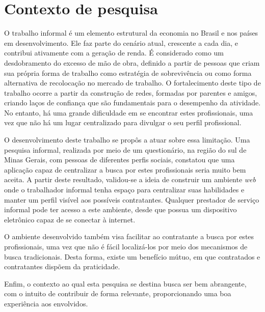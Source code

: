 \section{Contexto de pesquisa}
\par O trabalho informal é um elemento estrutural da economia no Brasil e nos países em desenvolvimento. Ele faz parte do cenário atual, crescente a cada dia, e contribui ativamente com a geração de renda. É considerado como um desdobramento do excesso de mão de obra, definido a partir de pessoas que criam sua própria forma de trabalho como estratégia de sobrevivência ou como forma alternativa de recolocação no mercado de trabalho. O fortalecimento deste tipo de trabalho ocorre a partir da construção de redes, formadas por parentes e amigos, criando laços de confiança que são fundamentais para o desempenho da atividade. No entanto, há uma grande dificuldade em se encontrar estes profissionais, uma vez que não há um lugar centralizado para divulgar o seu perfil profissional.

\par O desenvolvimento deste trabalho se propôs a atuar sobre essa limitação. Uma pesquisa informal, realizada por meio de um questionário, na região do sul de Minas Gerais, com pessoas de diferentes perfis sociais, constatou que uma aplicação capaz de centralizar a busca por estes profissionais seria muito bem aceita. A partir deste resultado, validou-se a ideia de construir um ambiente \textit{web} onde o trabalhador informal tenha espaço para centralizar suas habilidades e manter um perfil visível aos possíveis contratantes. Qualquer prestador de serviço informal pode ter acesso a este ambiente, desde que possua um dispositivo eletrônico capaz de se conectar à internet. 

\par O ambiente desenvolvido também visa facilitar ao contratante a busca por estes profissionais, uma vez que não é fácil localizá-los por meio dos mecanismos de busca tradicionais. Desta forma, existe um benefício mútuo, em que contratados e contratantes dispõem da praticidade.

\par Enfim, o contexto ao qual esta pesquisa se destina busca ser bem abrangente, com o intuito de contribuir de forma relevante, proporcionando uma boa experiência aos envolvidos.
 

